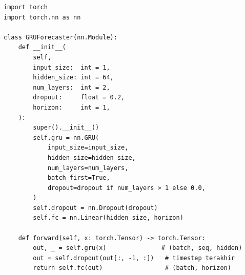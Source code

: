 \begin{lstlisting}[caption={Implementasi Arsitektur Model GRU}, label={lst:gru-model}, style=pythonstyle]
import torch
import torch.nn as nn

class GRUForecaster(nn.Module):
    def __init__(
        self,
        input_size:  int = 1,
        hidden_size: int = 64,
        num_layers:  int = 2,
        dropout:     float = 0.2,
        horizon:     int = 1,
    ):
        super().__init__()
        self.gru = nn.GRU(
            input_size=input_size,
            hidden_size=hidden_size,
            num_layers=num_layers,
            batch_first=True,
            dropout=dropout if num_layers > 1 else 0.0,
        )
        self.dropout = nn.Dropout(dropout)
        self.fc = nn.Linear(hidden_size, horizon)

    def forward(self, x: torch.Tensor) -> torch.Tensor:
        out, _ = self.gru(x)               # (batch, seq, hidden)
        out = self.dropout(out[:, -1, :])   # timestep terakhir
        return self.fc(out)                 # (batch, horizon)
\end{lstlisting}
